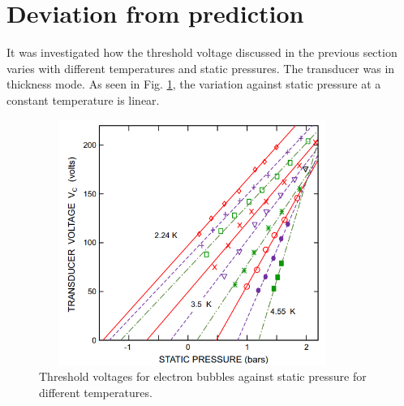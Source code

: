 \section{Deviation from prediction}
It was investigated how the threshold voltage discussed in the previous section varies with different temperatures and static pressures. The transducer was in thickness mode. As seen in Fig. \ref{non_linear1}, the variation against static pressure at a constant temperature is linear.
\begin{figure}[H]
\centering 
\includegraphics[width=100mm, height=80mm]{Nucleation_Experiment/non_linear1.PNG}
\caption{Threshold voltages for electron bubbles against static pressure for different temperatures. \cite{Yang2018thesis}}
\label{non_linear1}
\end{figure}


